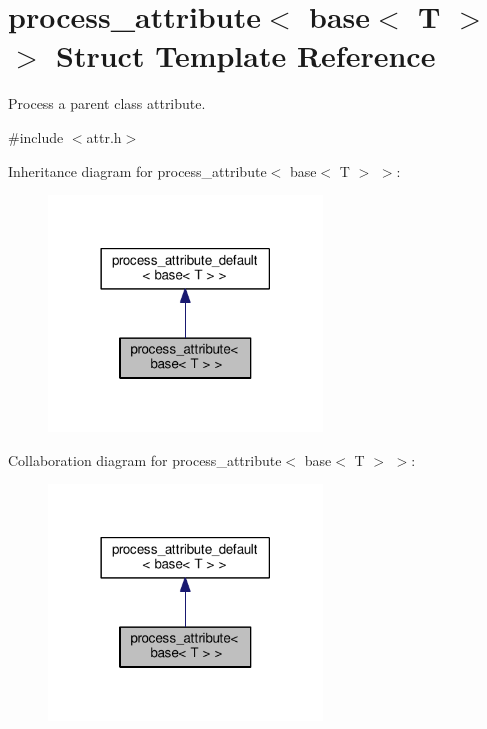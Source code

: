 \hypertarget{structprocess__attribute_3_01base_3_01_t_01_4_01_4}{}\section{process\+\_\+attribute$<$ base$<$ T $>$ $>$ Struct Template Reference}
\label{structprocess__attribute_3_01base_3_01_t_01_4_01_4}


Process a parent class attribute.  




{\ttfamily \#include $<$attr.\+h$>$}



Inheritance diagram for process\+\_\+attribute$<$ base$<$ T $>$ $>$\+:
\nopagebreak
\begin{figure}[H]
\begin{center}
\leavevmode
\includegraphics[width=206pt]{structprocess__attribute_3_01base_3_01_t_01_4_01_4__inherit__graph}
\end{center}
\end{figure}


Collaboration diagram for process\+\_\+attribute$<$ base$<$ T $>$ $>$\+:
\nopagebreak
\begin{figure}[H]
\begin{center}
\leavevmode
\includegraphics[width=206pt]{structprocess__attribute_3_01base_3_01_t_01_4_01_4__coll__graph}
\end{center}
\end{figure}
